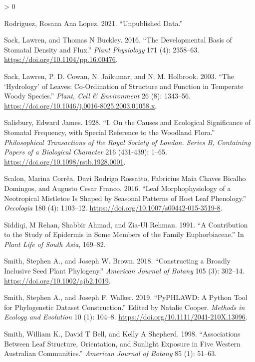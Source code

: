 \documentclass[
  10pt,
]{article}
\newlength{\cslhangindent}
\newenvironment{CSLReferences}[2] %
 {%
  \setlength{\parindent}{0pt}
  \ifodd #1 \everypar{\setlength{\hangindent}{\cslhangindent}}\ignorespaces\fi
  \ifnum #2 > 0
  \setlength{\parskip}{#2\baselineskip}
  \fi
 }%
 {}
\begin{document}
\begin{CSLReferences}{1}{0}
\leavevmode\hypertarget{ref-rodriguez_unpublished_2021}{}%
Rodriguez, Rosana Ana Lopez. 2021. {``Unpublished Data.''}

\leavevmode\hypertarget{ref-sack_developmental_2016}{}%
Sack, Lawren, and Thomas N Buckley. 2016. {``The Developmental Basis of Stomatal Density and Flux.''} \emph{Plant Physiology} 171 (4): 2358--63. \url{https://doi.org/10.1104/pp.16.00476}.

\leavevmode\hypertarget{ref-sack_hydrology_2003}{}%
Sack, Lawren, P. D. Cowan, N. Jaikumar, and N. M. Holbrook. 2003. {``The {`Hydrology'} of Leaves: Co-Ordination of Structure and Function in Temperate Woody Species.''} \emph{Plant, Cell \& Environment} 26 (8): 1343--56. \url{https://doi.org/10.1046/j.0016-8025.2003.01058.x}.

\leavevmode\hypertarget{ref-salisbury_i_1928}{}%
Salisbury, Edward James. 1928. {``I. {On} the Causes and Ecological Significance of Stomatal Frequency, with Special Reference to the Woodland Flora.''} \emph{Philosophical Transactions of the Royal Society of London. Series B, Containing Papers of a Biological Character} 216 (431-439): 1--65. \url{https://doi.org/10.1098/rstb.1928.0001}.

\leavevmode\hypertarget{ref-scalon_leaf_2016}{}%
Scalon, Marina Corrêa, Davi Rodrigo Rossatto, Fabricius Maia Chaves Bicalho Domingos, and Augusto Cesar Franco. 2016. {``Leaf Morphophysiology of a {Neotropical} Mistletoe Is Shaped by Seasonal Patterns of Host Leaf Phenology.''} \emph{Oecologia} 180 (4): 1103--12. \url{https://doi.org/10.1007/s00442-015-3519-8}.

\leavevmode\hypertarget{ref-siddiqi_contribution_1991}{}%
Siddiqi, M Rehan, Shabbir Ahmad, and Zia-Ul Rehman. 1991. {``A Contribution to the Study of Epidermis in Some Members of the Family {Euphorbiaceae}.''} In \emph{Plant {Life} of {South} {Asia}}, 169--82.

\leavevmode\hypertarget{ref-smith_constructing_2018}{}%
Smith, Stephen A., and Joseph W. Brown. 2018. {``Constructing a Broadly Inclusive Seed Plant Phylogeny.''} \emph{American Journal of Botany} 105 (3): 302--14. \url{https://doi.org/10.1002/ajb2.1019}.

\leavevmode\hypertarget{ref-smith_pyphlawd_2019}{}%
Smith, Stephen A., and Joseph F. Walker. 2019. {``{PyPHLAWD}: {A} Python Tool for Phylogenetic Dataset Construction.''} Edited by Natalie Cooper. \emph{Methods in Ecology and Evolution} 10 (1): 104--8. \url{https://doi.org/10.1111/2041-210X.13096}.

\leavevmode\hypertarget{ref-smith_associations_1998}{}%
Smith, William K., David T Bell, and Kelly A Shepherd. 1998. {``Associations Between Leaf Structure, Orientation, and Sunlight Exposure in Five {Western} {Australian} Communities.''} \emph{American Journal of Botany} 85 (1): 51--63.


\end{CSLReferences}
\end{document}
